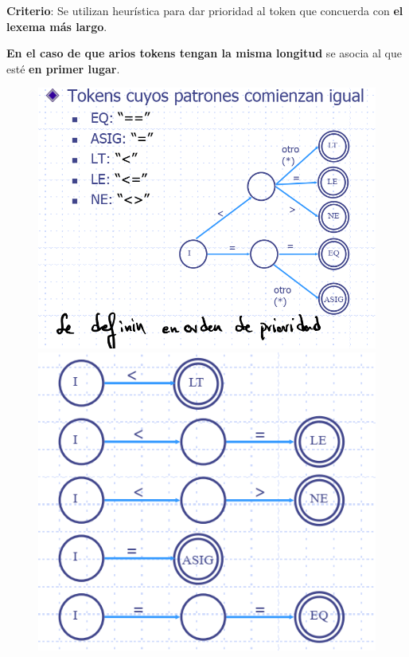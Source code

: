 \documentclass[12pt, twoside, openright]{report} %
\begin{document}
\textbf{Criterio}: Se utilizan heurística para dar prioridad al token
que concuerda con \textbf{el lexema más largo}.

\textbf{En el caso de que arios tokens tengan la misma longitud} se asocia al que
esté \textbf{en primer lugar}.

\begin{figure}[H]
	{\includegraphics[scale=.3]{image-20210305191616426.png}
	\includegraphics[scale=.3]{image-20210305191651759.png}}
\end{figure}
\end{document}
